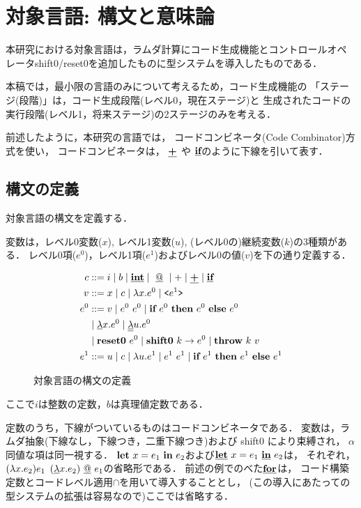 \chapter{対象言語: 構文と意味論}

本研究における対象言語は，ラムダ計算にコード生成機能とコントロールオペ
レータshift0/reset0を追加したものに型システムを導入したものである．

本稿では，最小限の言語のみについて考えるため，コード生成機能の
「ステージ(段階)」は，コード生成段階(レベル0，現在ステージ)と
生成されたコードの実行段階(レベル1，将来ステージ)の2ステージのみを考える．

前述したように，本研究の言語では，
コードコンビネータ(Code Combinator)方式を使い，
コードコンビネータは，
$\underline{\textbf{+}}$ や $\underline{\textbf{if}}$のように下線を引いて表す．

\section{構文の定義}

対象言語の構文を定義する．

変数は，レベル0変数($x$), レベル1変数($u$),
(レベル0の)継続変数($k$)の3種類がある．
レベル0項($e^0$)，レベル1項($e^1$)およびレベル0の値($v$)を下の通り定義する．

\begin{figure}[!ht]
  \centering
  \begin{align*}
    c & ::= i \mid b \mid \underline{\textbf{int}}
        \mid ~\underline{@}~ \mid + \mid \underline{\textbf{+}} \mid \underline{\textbf{if}} \\
    v & ::= x \mid c \mid \lambda{x}.{e^0} \mid \texttt{<}{e^1}\texttt{>} \\
    e^0 & ::=  v  \mid e^0~ e^0 \mid \textbf{if}~{e^0}~\textbf{then}~{e^0}~\textbf{else}~{e^0} \\
      & \mid \underline{\lambda}{x}.{e^0}
        \mid \underline{\underline{\lambda}}{u}.{e^0} \\
      & \mid \textbf{reset0}~{e^0}
        \mid \textbf{shift0}~{k}\to{e^0}
        \mid \textbf{throw}~{k}~{v} \\
    e^1 & ::=  u \mid c \mid \lambda{u}.{e^1} \mid e^1~ e^1
          \mid \textbf{if}~{e^1}~\textbf{then}~{e^1}~\textbf{else}~{e^1} \\
  \end{align*}
  \caption{対象言語の構文の定義}
\end{figure}

ここで$i$は整数の定数，$b$は真理値定数である．

定数のうち，下線がついているものはコードコンビネータである．
変数は，ラムダ抽象(下線なし，下線つき，二重下線つき)および shift0 により束縛され，
$\alpha$同値な項は同一視する．
$\textbf{let}~{x}={e_1}~\textbf{in}~{e_2}$および$\underline{\textbf{let}}~{x}={e_1}~\underline{\textbf{in}}~{e_2}$は，
それぞれ，$(\lambda{x}.{e_2})e_1$
$(\underline{\lambda}{x}.{e_2})~\underline{@}~ e_1$の省略形である．
前述の例でのべた$\underline{\textbf{for}}$は，
コード構築定数とコードレベル適用$\cap$を用いて導入することとし，
(この導入にあたっての型システムの拡張は容易なので)ここでは省略する．

